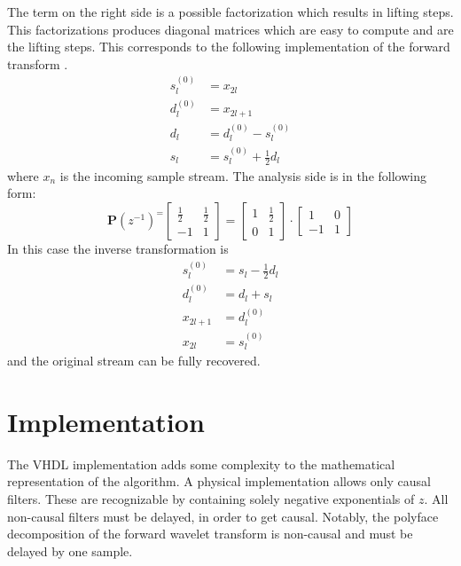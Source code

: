\begin{refsection}
The term on the right side is a possible factorization which results in lifting steps.
This factorizations produces diagonal matrices which are easy to compute and are the lifting steps.
This corresponds to the following implementation of the forward transform \cite{fpga:Daubechies1998}.
\begin{equation}\label{fpga:equation:haar}
	\begin{aligned}
	s_l^{(0)} &= x_{2l} \\
	d_l^{(0)} &= x_{2l+1} \\ 
	d_l &= d_l^{(0)} - s_l^{(0)} \\
	s_l &= s_l^{(0)} + \frac{1}{2}d_l
	\end{aligned}
\end{equation}
where $x_{n}$ is the incoming sample stream.
The analysis side is in the following form:
\begin{equation*}
\bm P(z^{-1})^ =
\begin{bmatrix}
\frac{1}{2} & \frac{1}{2} \\
-1 & 1
\end{bmatrix}
= 
\begin{bmatrix}
1 & \frac{1}{2} \\
0 & 1
\end{bmatrix}
\cdot
\begin{bmatrix}
1 & 0 \\
-1 & 1
\end{bmatrix}
\end{equation*}
In this case the inverse transformation is 
\begin{equation}\label{fpga:equation:inv_haar}
\begin{aligned}
s_l^{(0)} &= s_l - \frac{1}{2}d_l \\
d_l^{(0)} &= d_l + s_l \\ 
x_{2l+1}& =d_l^{(0)} \\
x_{2l} &= s_l^{(0)}
\end{aligned}
\end{equation}
and the original stream can be fully recovered.

\section{Implementation}

The VHDL implementation adds some complexity to the mathematical representation of the algorithm.
A physical implementation allows only causal filters.
These are recognizable by containing solely negative exponentials of $z$.
All non-causal filters must be delayed, in order to get causal.
Notably, the polyface decomposition of the forward wavelet transform is non-causal and must be delayed by one sample.


\end{refsection}

